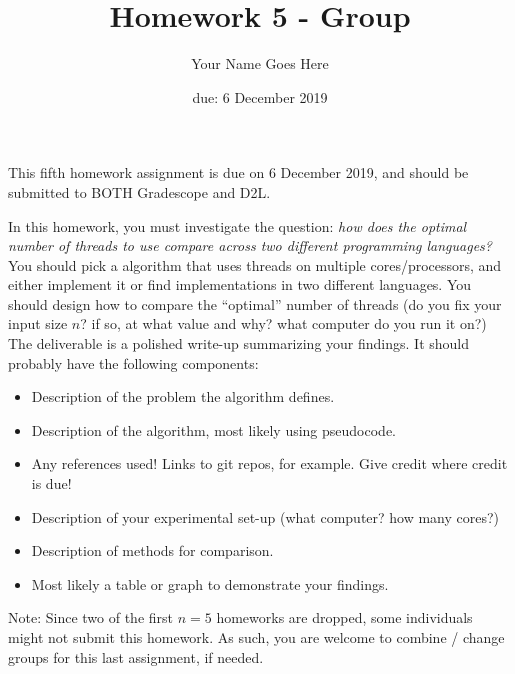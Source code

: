 \documentclass{article}
\author{Your Name Goes Here}
\date{due: 6 December 2019}
\title{Homework 5 - Group}
\begin{document}
\maketitle

This fifth homework assignment is due on 6 December 2019, and should be
submitted to BOTH Gradescope and D2L.

In this homework, you must investigate the question: \emph{how does the optimal
number of threads to use compare across two different programming languages?}
You should pick a algorithm that uses threads on multiple cores/processors,
and either implement it or find implementations in
two different languages. You should design how to compare the ``optimal'' number
of threads (do you fix your input size $n$?
if so, at what value and why? what computer do you
run it on?) The deliverable is a polished write-up summarizing your findings.
It should probably have the following components:
\begin{itemize}
    \item Description of the problem the algorithm defines.
    \item Description of the algorithm, most likely using pseudocode.
    \item Any references used! Links to git repos, for example.  Give credit
        where credit is due!
    \item Description of your experimental set-up (what computer? how many
        cores?)
    \item Description of methods for comparison.
    \item Most likely a table or graph to demonstrate your findings.
\end{itemize}

Note: Since two of the first $n=5$ homeworks are dropped, some individuals might
not submit this homework.  As such, you are welcome to combine / change groups
for this last assignment, if needed.
\end{document}
